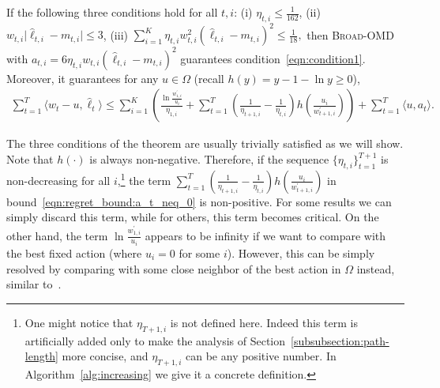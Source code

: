 \documentclass[final, 12pt]{colt2018} %
\newcommand{\p}{\prime}
\newcommand{\inn}[1]{ \langle {#1} \rangle }
\newcommand{\abs}[1]{ \lvert {#1} \rvert }
\begin{document}
\begin{theorem}
\label{lemma:MAB_condition}
If the following three conditions hold for all $t,i$: 
(i) $\eta_{t,i}\leq \frac{1}{162}$,
(ii) $w_{t,i}\abs{\hat{\ell}_{t,i}-m_{t,i}}\leq 3$,
(iii) $\sum_{i=1}^K \eta_{t,i}w_{t,i}^2(\hat{\ell}_{t,i}-m_{t,i})^2\leq \frac{1}{18},$
then \textsc{Broad-OMD} with $a_{t,i}=6\eta_{t,i}w_{t,i}(\hat{\ell}_{t,i}-m_{t,i})^2$ guarantees condition~\eqref{eqn:condition1}.
Moreover, it guarantees for any $u\in \Omega$ (recall $h(y) = y - 1 - \ln y \geq 0$), 
\begin{align}
\sum_{t=1}^T \inn{w_t-u, \hat{\ell}_t}\leq \sum_{i=1}^K \left( \frac{\ln\frac{w^\p_{1,i}}{u_i}}{\eta_{1,i}} + \sum_{t=1}^T \left(\frac{1}{\eta_{t+1,i}}-\frac{1}{\eta_{t,i}}\right)h\left(\frac{u_i}{w_{t+1,i}^\p}\right) \right) +\sum_{t=1}^T \inn{u,a_t}. \label{eqn:regret_bound:a_t_neq_0} 
\end{align}
\end{theorem}

The three conditions of the theorem are usually trivially satisfied as we will show.
Note that $h(\cdot)$ is always non-negative. Therefore, if the sequence $\{\eta_{t,i}\}_{t=1}^{T+1}$ is non-decreasing for all $i$,\footnote{%
One might notice that $\eta_{T+1, i}$ is not defined here.
Indeed this term is artificially added only to make the analysis of Section~\ref{subsubsection:path-length} more concise, and $\eta_{T+1,i}$ can be any positive number.
In Algorithm~\ref{alg:increasing} we give it a concrete definition.
} 
the term $\sum_{t=1}^T \left(\frac{1}{\eta_{t+1,i}}-\frac{1}{\eta_{t,i}}\right)h\left(\frac{u_i}{w_{t+1,i}^\p}\right)$ in bound~\eqref{eqn:regret_bound:a_t_neq_0} 
is non-positive. For some results we can simply discard this term, while for others, this term becomes critical.
On the other hand, the term $\ln\frac{w^\p_{1,i}}{u_i}$ appears to be infinity if we want to compare with the best fixed action (where $u_i = 0$ for some $i$).
However, this can be simply resolved by comparing with some close neighbor of the best action in $\Omega$ instead, similar to~\citep{foster2016learning, agarwal2017corralling}.
\end{document}
